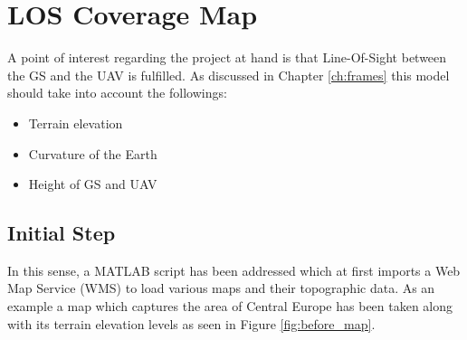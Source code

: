 \section{LOS Coverage Map}\label{sec:los_map}
A point of interest regarding the project at hand is that Line-Of-Sight between the GS and the UAV is fulfilled. As discussed in Chapter \ref{ch:frames} this model should take into account the followings:

\begin{itemize}
	\item Terrain elevation
	\item Curvature of the Earth
	\item Height of GS and UAV
\end{itemize}


\subsection{Initial Step}
In this sense, a MATLAB script has been addressed which at first imports a Web Map Service (WMS) to load various maps and their topographic data. As an example a map which captures the area of Central Europe has been taken along with its terrain elevation levels as seen in Figure \ref{fig:before_map}.

